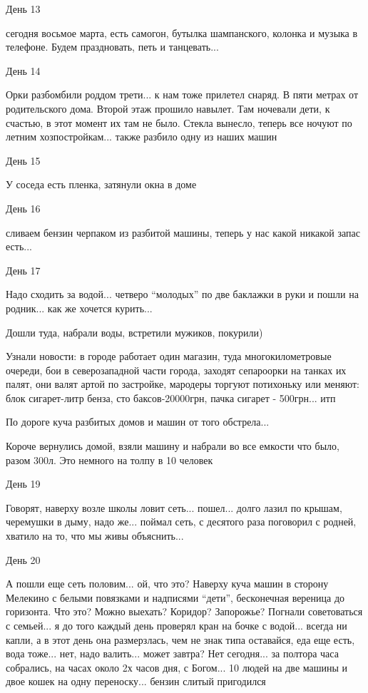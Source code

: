 День 13 

сегодня восьмое марта, есть самогон, бутылка шампанского, колонка и музыка в
телефоне. Будем праздновать, петь и танцевать...

День 14

Орки разбомбили роддом трети... к нам тоже прилетел снаряд. В пяти метрах от
родительского дома. Второй этаж прошило навылет. Там ночевали дети, к счастью,
в этот момент их там не было. Стекла вынесло, теперь все ночуют по летним
хозпостройкам... также разбило одну из наших машин

День 15 

У соседа есть пленка, затянули окна в доме

День 16 

сливаем бензин черпаком из разбитой машины, теперь у нас какой никакой запас есть...

День 17

Надо сходить за водой... четверо \enquote{молодых} по две баклажки в руки и
пошли на родник... как же хочется курить...

Дошли туда, набрали воды, встретили мужиков, покурили)

Узнали новости: в городе работает один магазин, туда многокилометровые очереди,
бои в северозападной части города, заходят сепароорки на танках их палят, они
валят артой по застройке, мародеры торгуют потихоньку или меняют: блок
сигарет-литр бенза, сто баксов-20000грн, пачка сигарет - 500грн... итп

По дороге куча разбитых домов и машин от того обстрела...

Короче вернулись домой, взяли машину и набрали во все емкости что было, разом
300л. Это немного на толпу в 10 человек

День 19

Говорят, наверху возле школы ловит сеть... пошел... долго лазил по крышам,
черемушки в дыму, надо же... поймал сеть, с десятого раза поговорил с родней,
хватило на то, что мы живы объяснить...

День 20

А пошли еще сеть половим... ой, что это? Наверху куча машин в сторону Мелекино с
белыми повязками и надписями \enquote{дети}, бесконечная вереница до горизонта. Что
это? Можно выехать? Коридор? Запорожье? Погнали советоваться с семьей... я до
того каждый день проверял кран на бочке с водой... всегда ни капли, а в этот день
она размерзлась, чем не знак типа оставайся, еда еще есть, вода тоже... нет, надо
валить... может завтра? Нет сегодня... за полтора часа собрались, на часах около 2х
часов дня, с Богом... 10 людей на две машины и двое кошек на одну
переноску... бензин слитый пригодился

